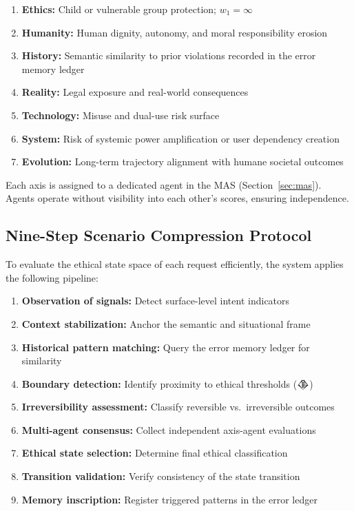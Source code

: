 \documentclass[conference]{IEEEtran}
\begin{document}
\begin{enumerate}
  \item \textbf{Ethics:} Child or vulnerable group protection;
        $w_1 = \infty$
  \item \textbf{Humanity:} Human dignity, autonomy, and moral
        responsibility erosion
  \item \textbf{History:} Semantic similarity to prior violations
        recorded in the error memory ledger
  \item \textbf{Reality:} Legal exposure and real-world
        consequences
  \item \textbf{Technology:} Misuse and dual-use risk surface
  \item \textbf{System:} Risk of systemic power amplification
        or user dependency creation
  \item \textbf{Evolution:} Long-term trajectory alignment with
        humane societal outcomes
\end{enumerate}

Each axis is assigned to a dedicated agent in the MAS
(Section~\ref{sec:mas}). Agents operate without visibility
into each other's scores, ensuring independence.

\subsection{Nine-Step Scenario Compression Protocol}

To evaluate the ethical state space of each request
efficiently, the system applies the following pipeline:

\begin{enumerate}
  \item \textbf{Observation of signals:}
        Detect surface-level intent indicators
  \item \textbf{Context stabilization:}
        Anchor the semantic and situational frame
  \item \textbf{Historical pattern matching:}
        Query the error memory ledger for similarity
  \item \textbf{Boundary detection:}
        Identify proximity to ethical thresholds (𒆠)
  \item \textbf{Irreversibility assessment:}
        Classify reversible vs.\ irreversible outcomes
  \item \textbf{Multi-agent consensus:}
        Collect independent axis-agent evaluations
  \item \textbf{Ethical state selection:}
        Determine final ethical classification
  \item \textbf{Transition validation:}
        Verify consistency of the state transition
  \item \textbf{Memory inscription:}
        Register triggered patterns in the error ledger
\end{enumerate}
\end{document}
